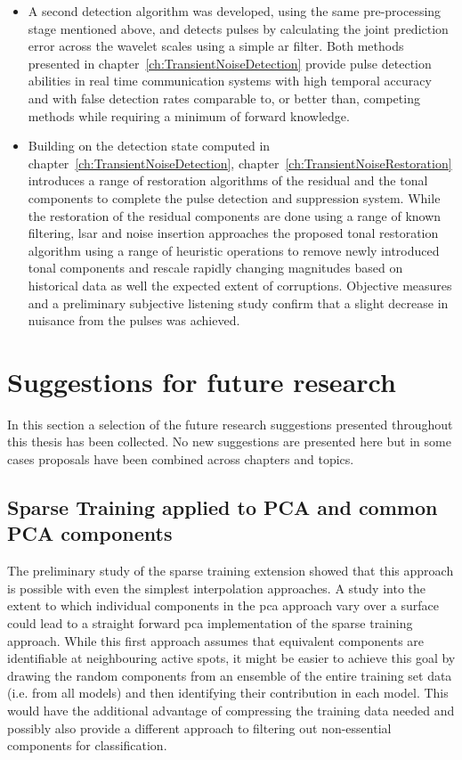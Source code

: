 \begin{itemize}
  \item A second detection algorithm was developed, using the same pre-processing stage mentioned above, and detects pulses by calculating the joint prediction error across the wavelet scales using a simple \gls{ar} filter. Both methods presented in chapter~\ref{ch:TransientNoiseDetection} provide pulse detection abilities in real time communication systems with high temporal accuracy and with false detection rates comparable to, or better than, competing methods while requiring a minimum of forward knowledge.
  \item Building on the detection state computed in chapter~\ref{ch:TransientNoiseDetection}, chapter~\ref{ch:TransientNoiseRestoration} introduces a range of restoration algorithms of the residual and the tonal components to complete the pulse detection and suppression system. While the restoration of the residual components are done using a range of known filtering, \gls{lsar} and noise insertion approaches the proposed tonal restoration algorithm using a range of heuristic operations to remove newly introduced tonal components and rescale rapidly changing magnitudes based on historical data as well the expected extent of corruptions. Objective measures and a preliminary subjective listening study confirm that a slight decrease in nuisance from the pulses was achieved.
\end{itemize}


\section{Suggestions for future research}
In this section a selection of the future research suggestions presented throughout this thesis has been collected. No new suggestions are presented here but in some cases proposals have been combined across chapters and topics.

\subsection{Sparse Training applied to PCA and common PCA components}
The preliminary study of the sparse training extension showed that this approach is possible with even the simplest interpolation approaches. A study into the extent to which individual components in the \gls{pca} approach vary over a surface could lead to a straight forward \gls{pca} implementation of the sparse training approach. While this first approach assumes that equivalent components are identifiable at neighbouring active spots, it might be easier to achieve this goal by drawing the random components from an ensemble of the entire training set data (i.e. from all models) and then identifying their contribution in each model. This would have the additional advantage of compressing the training data needed and possibly also provide a different approach to filtering out non-essential components for classification.

